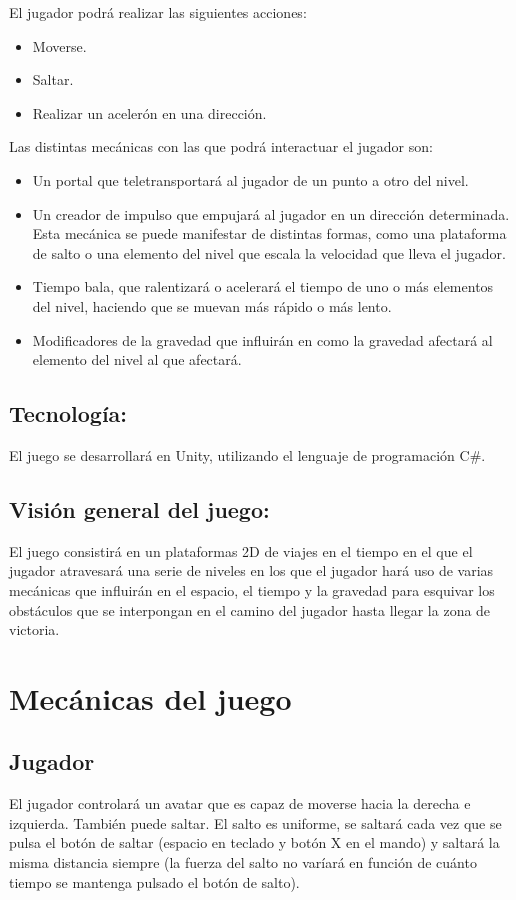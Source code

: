 El jugador podrá realizar las siguientes acciones:
\begin{itemize}
\item
Moverse.
\item
Saltar.
\item
Realizar un acelerón en una dirección.
\end{itemize}
Las distintas mecánicas con las que podrá interactuar el jugador son:
\begin{itemize}
\item
Un portal que teletransportará al jugador de un punto a otro del nivel.
\item
Un creador de impulso que empujará al jugador en un dirección determinada. Esta mecánica se puede manifestar de distintas formas, como una plataforma de salto o una elemento del nivel que escala la velocidad que lleva el jugador.
\item
Tiempo bala, que ralentizará o acelerará el tiempo de uno o más elementos del nivel, haciendo que se muevan más rápido o más lento.
\item
Modificadores de la gravedad que influirán en como la gravedad afectará al elemento del nivel al que afectará.
\end{itemize}

\subsection{Tecnología:}
El juego se desarrollará en Unity, utilizando el lenguaje de programación C\#.

\subsection{Visión general del juego:}
El juego consistirá en un plataformas 2D de viajes en el tiempo en el que el jugador atravesará una serie de niveles en los que el jugador hará uso de varias mecánicas que influirán en el espacio, el tiempo y la gravedad para esquivar los obstáculos que se interpongan en el camino del jugador hasta llegar la zona de victoria. 

\section{Mecánicas del juego}
\subsection{Jugador}
El jugador controlará un avatar que es capaz de moverse hacia la derecha e izquierda. También puede saltar. El salto es uniforme, se saltará cada vez que se pulsa el botón de saltar (espacio en teclado y botón X en el mando) y saltará la misma distancia siempre (la fuerza del salto no varíará en función de cuánto tiempo se mantenga pulsado el botón de salto). 

